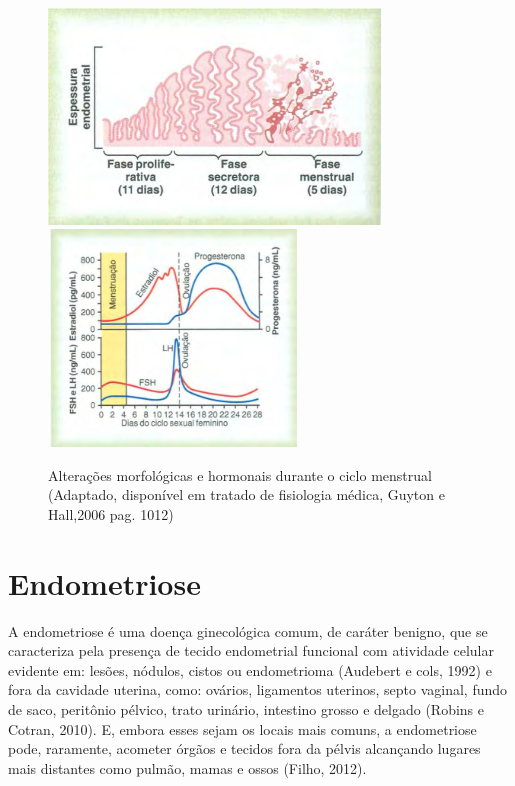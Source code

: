 \documentclass[12pt]{article} %
\begin{document}
\begin{figure}[h!]
\centering
\includegraphics[width=8.8cm]{ciclo.png}
\includegraphics[width=6.6cm]{cilco2.png}
\caption[Alterações morfológicas e hormonais durante o ciclo menstrual]{ Alterações morfológicas e hormonais durante o ciclo menstrual (Adaptado, disponível em tratado de fisiologia médica, Guyton e Hall,2006 pag. 1012)} 
\label{ciclo menstrual}
\end{figure} 

\section{Endometriose}

A endometriose é uma doença ginecológica comum, de caráter benigno,
que se caracteriza pela presença de tecido endometrial funcional com
atividade celular evidente em: lesões, nódulos, cistos ou
endometrioma (Audebert e cols, 1992) e fora da cavidade uterina, como:
ovários, ligamentos uterinos, septo vaginal, fundo de saco, peritônio
pélvico, trato urinário, intestino grosso e delgado (Robins e Cotran, 2010). E, embora
esses sejam os locais mais comuns, a endometriose pode, raramente,
acometer órgãos e tecidos fora da pélvis alcançando lugares mais distantes 
 como pulmão, mamas e ossos (Filho,
2012). %
\newpage
\end{document}
